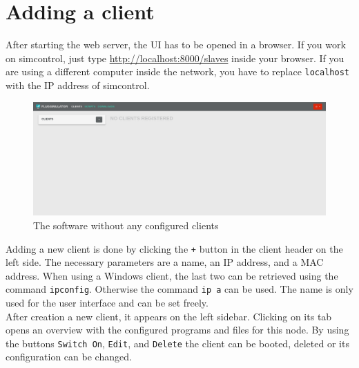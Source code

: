 \documentclass[accentcolor=tud1a, paper=a4, colorback]{tudreport}
\newcommand{\ind}[1]{#1\index{#1}}
\begin{document}
	\section{Adding a client}
	After starting the web server, the UI has to be opened in a browser.
	If you work on \ind{simcontrol}, just type \url{http://localhost:8000/slaves} inside
	your browser. If you are using a different computer inside the network, you
	have to replace \texttt{localhost} with the IP address of simcontrol.
	\\
	\begin{figure}[h]
		\centering
		\includegraphics[width=.9\textwidth]{empty_startpage}
		\caption{The software without any configured clients}
		\label{empty_startpage}
	\end{figure}
	Adding a new client is done by clicking the \texttt{+} button in the
	client header on the left side.
	The necessary parameters are a name, an IP address,
	and a MAC address. When using a Windows client, the last two can be retrieved using
	the command \texttt{ipconfig}. Otherwise the command \texttt{ip a} can be used.
	The name is only used for the user interface
	and can be set freely.
	\\
	After creation a new client, it appears on the left sidebar. Clicking on its tab
	opens an overview with the configured programs and files for this node.
	By using the buttons \texttt{Switch On}, \texttt{Edit}, and \texttt{Delete}
	the client can be booted, deleted or its configuration can be changed.
\end{document}
